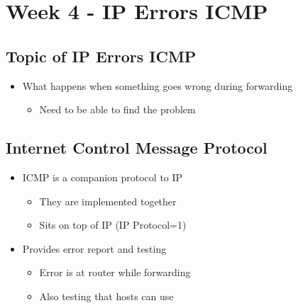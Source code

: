 \documentclass[12pt]{ctexart}   %
\begin{document}
\section{Week 4 - IP Errors ICMP}
	\subsection{Topic of IP Errors ICMP}
	\begin{itemize}
		\item What happens when  something goes wrong during forwarding
		\begin{itemize}
			\item Need to be able to find the problem
		\end{itemize}
	\end{itemize}
	
	\subsection{Internet Control Message Protocol}
	\begin{itemize}
		\item ICMP is a companion protocol to IP
		\begin{itemize}
			\item They are implemented together
			\item Sits on top of IP (IP Protocol=1)
		\end{itemize}
		
		\item Provides error report and testing
		\begin{itemize}
			\item Error is at router while forwarding
			\item Also testing that hosts can use
		\end{itemize}
	\end{itemize}
	
\end{document}
